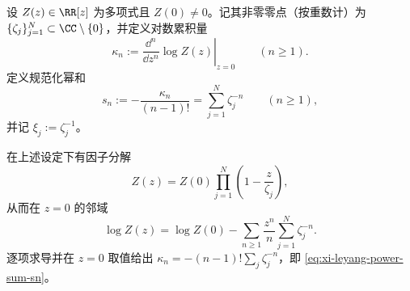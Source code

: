 \begin{definition}[对数累积量与规范化幂和]\label{def:xi-leyang-cumulant-power-sums}
设 \(Z(z)\in\RR[z]\) 为多项式且 \(Z(0)\neq 0\)。记其非零零点（按重数计）为 \(\{\zeta_j\}_{j=1}^N\subset\CC\setminus\{0\}\)，并定义对数累积量
\[
\kappa_n:=\left.\frac{\dd^n}{\dd z^n}\log Z(z)\right|_{z=0}\qquad(n\ge 1).
\]
定义规范化幂和
\begin{equation}\label{eq:xi-leyang-power-sum-sn}
s_n:=-\frac{\kappa_n}{(n-1)!}=\sum_{j=1}^N \zeta_j^{-n}\qquad(n\ge 1),
\end{equation}
并记 \(\xi_j:=\zeta_j^{-1}\)。
\end{definition}

\begin{remark}[零点--累积量幂和恒等式]\label{rem:xi-leyang-zero-cumulant-identity}
在上述设定下有因子分解
\[
Z(z)=Z(0)\prod_{j=1}^N\left(1-\frac{z}{\zeta_j}\right),
\]
从而在 \(z=0\) 的邻域
\[
\log Z(z)=\log Z(0)-\sum_{n\ge 1}\frac{z^n}{n}\sum_{j=1}^N\zeta_j^{-n}.
\]
逐项求导并在 \(z=0\) 取值给出
\(
\kappa_n=-(n-1)!\sum_j\zeta_j^{-n}
\)，即 \eqref{eq:xi-leyang-power-sum-sn}。
\end{remark}

